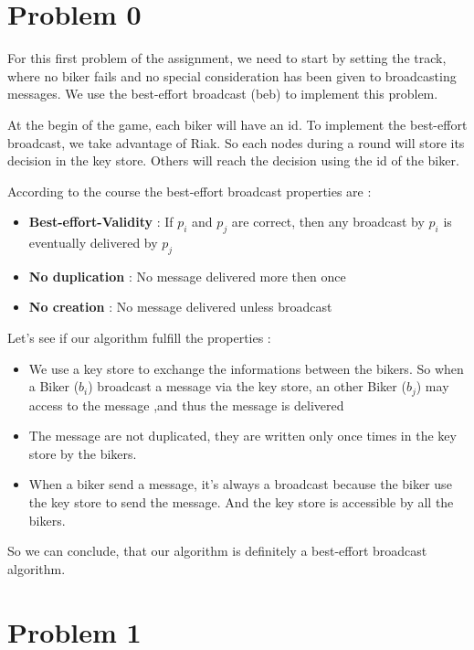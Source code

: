 \documentclass{article}
\begin{document}
\section*{Problem 0}
For this first problem of the assignment, we need to start by setting the track, where no biker fails and no special
consideration has been given to broadcasting messages. We use the best-effort broadcast (beb) to implement 
this problem.\newline


At the begin of the game, each biker will have an id.  To implement the best-effort broadcast, we take advantage of
Riak. So each nodes during a round will store its decision in the key store. Others will reach the decision using the id of 
the biker.\newline


According to the course the best-effort broadcast properties are :
\begin{itemize}
\item \textbf{Best-effort-Validity} : If $p_{i}$ and  $p_{j}$ are correct, then any broadcast by  $p_{i}$ is eventually delivered by  $p_{j}$
\item \textbf{No duplication} : No message delivered more then once
\item \textbf{No creation} : No message delivered unless broadcast
\end{itemize}

Let's see if our algorithm fulfill the properties :
\begin{itemize}
\item We use a key store to exchange the informations between the bikers. So when a Biker ($b_{i}$) broadcast a message via the key store,
an other Biker ($b_{j}$) may access to the message ,and thus the message is delivered
\item The message are not duplicated, they are written only once times in the key store by the bikers.
\item When a biker send a message, it's always a broadcast because the biker use the key store to send the message. And the key store is
accessible by all the bikers.
\end{itemize}

So we can conclude, that our algorithm is definitely a best-effort broadcast algorithm. 


\section*{Problem 1}
\end{document}
